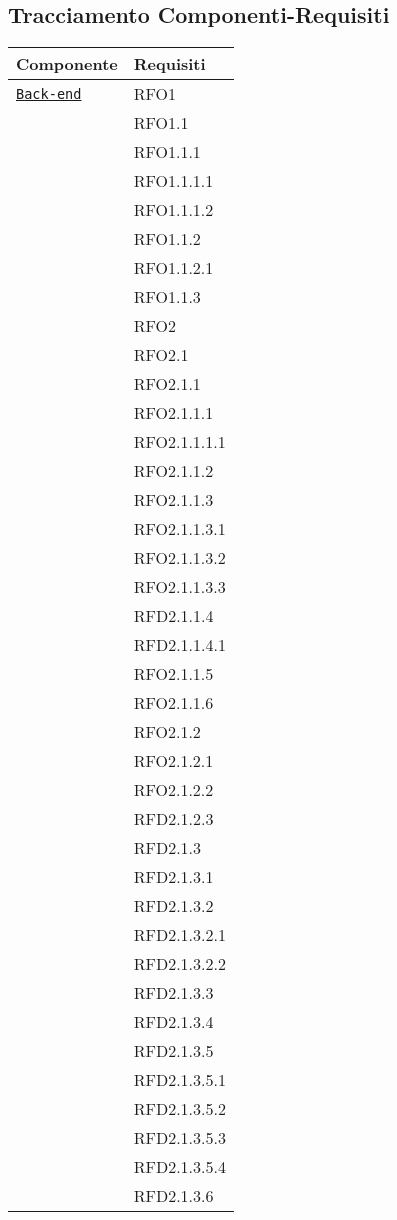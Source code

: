 \subsection{Tracciamento Componenti-Requisiti}
\normalsize
\begin{longtable}{|>{\centering}m{10cm}|m{3cm}<{\centering}|}
\hline
\textbf{Componente} & \textbf{Requisiti}\\
\hline
\endhead
\hyperref[Back-end]{\texttt{Back-end}} & RFO1\\
& RFO1.1\\
& RFO1.1.1\\
& RFO1.1.1.1\\
& RFO1.1.1.2\\
& RFO1.1.2\\
& RFO1.1.2.1\\
& RFO1.1.3\\
& RFO2\\
& RFO2.1\\
& RFO2.1.1\\
& RFO2.1.1.1\\
& RFO2.1.1.1.1\\
& RFO2.1.1.2\\
& RFO2.1.1.3\\
& RFO2.1.1.3.1\\
& RFO2.1.1.3.2\\
& RFO2.1.1.3.3\\
& RFD2.1.1.4\\
& RFD2.1.1.4.1\\
& RFO2.1.1.5\\
& RFO2.1.1.6\\
& RFO2.1.2\\
& RFO2.1.2.1\\
& RFO2.1.2.2\\
& RFD2.1.2.3\\
& RFD2.1.3\\
& RFD2.1.3.1\\
& RFD2.1.3.2\\
& RFD2.1.3.2.1\\
& RFD2.1.3.2.2\\
& RFD2.1.3.3\\
& RFD2.1.3.4\\
& RFD2.1.3.5\\
& RFD2.1.3.5.1\\
& RFD2.1.3.5.2\\
& RFD2.1.3.5.3\\
& RFD2.1.3.5.4\\
& RFD2.1.3.6\\

\end{longtable}
